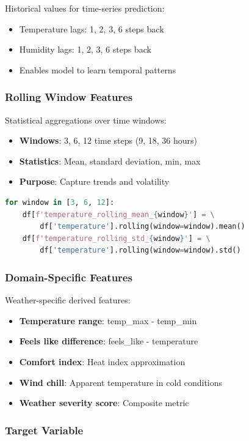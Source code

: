 \documentclass[12pt,a4paper]{article}
\begin{document}
Historical values for time-series prediction:
\begin{itemize}
    \item Temperature lags: 1, 2, 3, 6 steps back
    \item Humidity lags: 1, 2, 3, 6 steps back
    \item Enables model to learn temporal patterns
\end{itemize}

\subsubsection{Rolling Window Features}

Statistical aggregations over time windows:
\begin{itemize}
    \item \textbf{Windows}: 3, 6, 12 time steps (9, 18, 36 hours)
    \item \textbf{Statistics}: Mean, standard deviation, min, max
    \item \textbf{Purpose}: Capture trends and volatility
\end{itemize}

\begin{lstlisting}[language=Python, caption=Rolling Features]
for window in [3, 6, 12]:
    df[f'temperature_rolling_mean_{window}'] = \
        df['temperature'].rolling(window=window).mean()
    df[f'temperature_rolling_std_{window}'] = \
        df['temperature'].rolling(window=window).std()
\end{lstlisting}

\subsubsection{Domain-Specific Features}

Weather-specific derived features:
\begin{itemize}
    \item \textbf{Temperature range}: temp\_max - temp\_min
    \item \textbf{Feels like difference}: feels\_like - temperature
    \item \textbf{Comfort index}: Heat index approximation
    \item \textbf{Wind chill}: Apparent temperature in cold conditions
    \item \textbf{Weather severity score}: Composite metric
\end{itemize}

\subsubsection{Target Variable}
\end{document}
